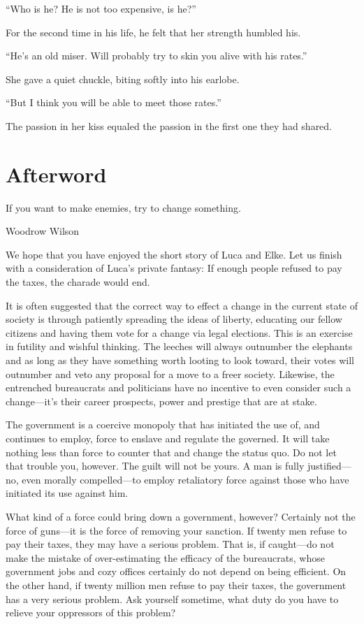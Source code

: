 ``Who is he? He is not too expensive, is he?''

For the second time in his life, he felt that her strength humbled his.

``He's an old miser. Will probably try to skin you alive with his rates.''

She gave a quiet chuckle, biting softly into his earlobe.

``But I think you will be able to meet those rates.''

The passion in her kiss equaled the passion in the first one they had shared.

\chapter*{Afterword}

\epigraph{If you want to make enemies, try to change something.}{Woodrow Wilson}

\firstparagraph

We hope that you have enjoyed the short story of Luca and Elke. Let us finish with a consideration of Luca's private fantasy: If enough people refused to pay the taxes, the charade would end.

It is often suggested that the correct way to effect a change in the current state of society is through patiently spreading the ideas of liberty, educating our fellow citizens and having them vote for a change via legal elections. This is an exercise in futility and wishful thinking. The leeches will always outnumber the elephants and as long as they have something worth looting to look toward, their votes will outnumber and veto any proposal for a move to a freer society. Likewise, the entrenched bureaucrats and politicians have no incentive to even consider such a change---it's their career prospects, power and prestige that are at stake.

The government is a coercive monopoly that has initiated the use of, and continues to employ, force to enslave and regulate the governed. It will take nothing less than force to counter that and change the status quo. Do not let that trouble you, however. The guilt will not be yours. A man is fully justified---no, even morally compelled---to employ retaliatory force against those who have initiated its use against him.

What kind of a force could bring down a government, however? Certainly not the force of guns---it is the force of removing your sanction. If twenty men refuse to pay their taxes, they may have a serious problem. That is, if caught---do not make the mistake of over-estimating the efficacy of the bureaucrats, whose government jobs and cozy offices certainly do not depend on being efficient. On the other hand, if twenty million men refuse to pay their taxes, the government has a very serious problem. Ask yourself sometime, what duty do you have to relieve your oppressors of this problem?

